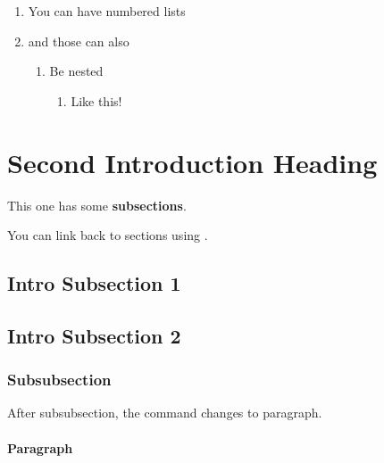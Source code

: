 \documentclass[a5paper, openany, twoside, 10pt]{memoir}
\begin{document}
\begin{enumerate}
    \item You can have numbered lists
    \item and those can also
    \begin{enumerate}
        \item Be nested
        \begin{enumerate}
            \item Like this!
        \end{enumerate}
    \end{enumerate}
\end{enumerate}

\vfill
\pagebreak

\section{Second Introduction Heading}

This one has some \textbf{subsections}.

You can link back to sections using .

\subsection{Intro Subsection 1}

\lipsum[2]

\subsection{Intro Subsection 2}

\lipsum[1]

\subsubsection{Subsubsection}

After subsubsection, the command changes to paragraph.

\paragraph{Paragraph}
\end{document}
